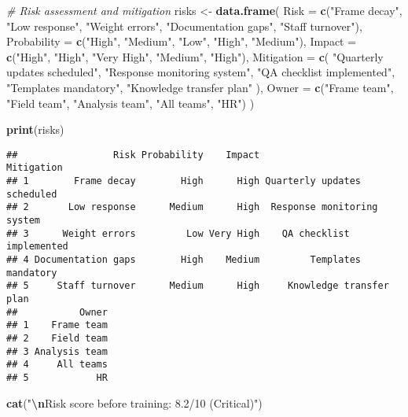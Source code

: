 \documentclass[
]{article}
\newenvironment{Shaded}{\begin{snugshade}}{\end{snugshade}}
\newcommand{\AttributeTok}[1]{\textcolor[rgb]{0.13,0.29,0.53}{#1}}
\newcommand{\CommentTok}[1]{\textcolor[rgb]{0.56,0.35,0.01}{\textit{#1}}}
\newcommand{\FunctionTok}[1]{\textcolor[rgb]{0.13,0.29,0.53}{\textbf{#1}}}
\newcommand{\NormalTok}[1]{#1}
\newcommand{\OtherTok}[1]{\textcolor[rgb]{0.56,0.35,0.01}{#1}}
\newcommand{\SpecialCharTok}[1]{\textcolor[rgb]{0.81,0.36,0.00}{\textbf{#1}}}
\newcommand{\StringTok}[1]{\textcolor[rgb]{0.31,0.60,0.02}{#1}}
\begin{document}
\begin{Shaded}
\begin{Highlighting}[]
\CommentTok{\# Risk assessment and mitigation}
\NormalTok{risks }\OtherTok{\textless{}{-}} \FunctionTok{data.frame}\NormalTok{(}
  \AttributeTok{Risk =} \FunctionTok{c}\NormalTok{(}\StringTok{"Frame decay"}\NormalTok{, }\StringTok{"Low response"}\NormalTok{, }\StringTok{"Weight errors"}\NormalTok{,}
           \StringTok{"Documentation gaps"}\NormalTok{, }\StringTok{"Staff turnover"}\NormalTok{),}
  \AttributeTok{Probability =} \FunctionTok{c}\NormalTok{(}\StringTok{"High"}\NormalTok{, }\StringTok{"Medium"}\NormalTok{, }\StringTok{"Low"}\NormalTok{, }\StringTok{"High"}\NormalTok{, }\StringTok{"Medium"}\NormalTok{),}
  \AttributeTok{Impact =} \FunctionTok{c}\NormalTok{(}\StringTok{"High"}\NormalTok{, }\StringTok{"High"}\NormalTok{, }\StringTok{"Very High"}\NormalTok{, }\StringTok{"Medium"}\NormalTok{, }\StringTok{"High"}\NormalTok{),}
  \AttributeTok{Mitigation =} \FunctionTok{c}\NormalTok{(}
    \StringTok{"Quarterly updates scheduled"}\NormalTok{,}
    \StringTok{"Response monitoring system"}\NormalTok{,}
    \StringTok{"QA checklist implemented"}\NormalTok{,}
    \StringTok{"Templates mandatory"}\NormalTok{,}
    \StringTok{"Knowledge transfer plan"}
\NormalTok{  ),}
  \AttributeTok{Owner =} \FunctionTok{c}\NormalTok{(}\StringTok{"Frame team"}\NormalTok{, }\StringTok{"Field team"}\NormalTok{, }\StringTok{"Analysis team"}\NormalTok{,}
            \StringTok{"All teams"}\NormalTok{, }\StringTok{"HR"}\NormalTok{)}
\NormalTok{)}

\FunctionTok{print}\NormalTok{(risks)}
\end{Highlighting}
\end{Shaded}

\begin{verbatim}
##                 Risk Probability    Impact                  Mitigation
## 1        Frame decay        High      High Quarterly updates scheduled
## 2       Low response      Medium      High  Response monitoring system
## 3      Weight errors         Low Very High    QA checklist implemented
## 4 Documentation gaps        High    Medium         Templates mandatory
## 5     Staff turnover      Medium      High     Knowledge transfer plan
##           Owner
## 1    Frame team
## 2    Field team
## 3 Analysis team
## 4     All teams
## 5            HR
\end{verbatim}

\begin{Shaded}
\begin{Highlighting}[]
\FunctionTok{cat}\NormalTok{(}\StringTok{"}\SpecialCharTok{\textbackslash{}n}\StringTok{Risk score before training: 8.2/10 (Critical)"}\NormalTok{)}
\end{Highlighting}
\end{Shaded}
\end{document}
